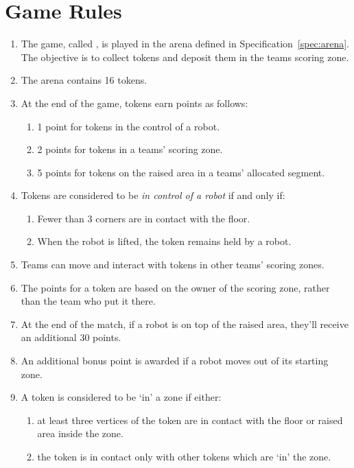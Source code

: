 \section{Game Rules}
\label{sec:rules}

\begin{enumerate}
  \item The game, called \emph{\gamename}, is played in the arena defined in
        Specification~\ref{spec:arena}. The objective is to collect tokens and
        deposit them in the teams scoring zone.
  \item The arena contains 16 tokens.
  \item At the end of the game, tokens earn points as follows:
    \begin{enumerate}
      \item 1 point for tokens in the control of a robot.
      \item 2 points for tokens in a teams' scoring zone.
      \item 5 points for tokens on the raised area in a teams' allocated segment.
    \end{enumerate}
  \item Tokens are considered to be \textit{in control of a robot } if and only if:
    \begin{enumerate}
      \item Fewer than 3 corners are in contact with the floor.
      \item When the robot is lifted, the token remains held by a robot.
    \end{enumerate}
  \item Teams can move and interact with tokens in other teams' scoring zones.
  \item The points for a token are based on the owner of the scoring zone, rather than
        the team who put it there.
  \item At the end of the match, if a robot is on top of the raised area, they'll
        receive an additional 30 points.
  \item An additional bonus point is awarded if a robot moves out of its starting
        zone.
  \item A token is considered to be `in' a zone if either:
    \begin{enumerate}
      \item at least three vertices of the token are in contact with the floor or
            raised area inside the zone.
      \item the token is in contact only with other tokens which are `in' the zone.

\end{enumerate}
\end{enumerate}
